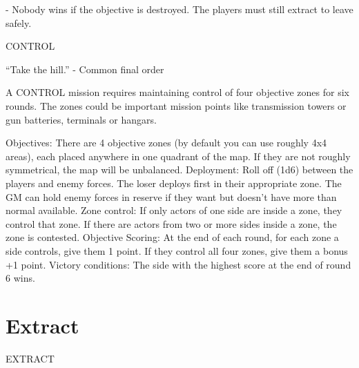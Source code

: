                                                                                                                      


          - Nobody wins if the objective is destroyed. The players must still extract to leave safely.  

CONTROL  

         “Take the hill.”  
                      -    Common final order  

A CONTROL mission requires maintaining control of four objective zones for six rounds. The  
zones could be important mission points like transmission towers or gun batteries, terminals or  
hangars.  

Objectives: There are 4 objective zones (by default you can use roughly 4x4 areas), each placed  
anywhere in one quadrant of the map. If they are not roughly symmetrical, the map will be  
unbalanced.  
Deployment: Roll off (1d6) between the players and enemy forces. The loser deploys first in their  
appropriate zone. The GM can hold enemy forces in reserve if they want but doesn’t have more  
than normal available.  
Zone control: If only actors of one side are inside a zone, they control that zone. If there are  
actors from two or more sides inside a zone, the zone is contested.  
Objective Scoring: At the end of each round, for each zone a side controls, give them 1 point. If  
they control all four zones, give them a bonus +1 point.  
Victory conditions: The side with the highest score at the end of round 6 wins.
 

                                                                                                                  

\section{Extract}
   

                                                                     EXTRACT  

